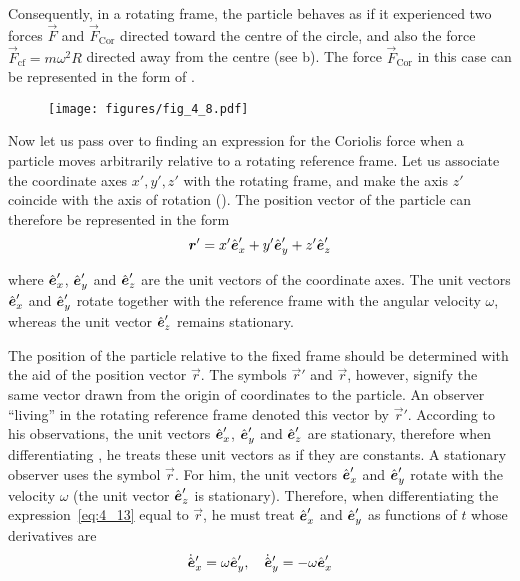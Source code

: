 \noindent
Consequently, in a rotating frame, the particle behaves as if it experienced two forces $\vec{F}$ and $\vec{F}_{\text{Cor}}$ directed toward the centre of the circle, and also the force $\vec{F}_{\text{cf}}=m\omega^2R$ directed away from the centre (see b). The force $\vec{F}_{\text{Cor}}$ in this case can be represented in the form of .

\begin{figure}[t]
	\begin{center}
		\texttt{[image: figures/fig\_4\_8.pdf]}
		\caption[]{}
		\label{fig:4_8}
	\end{center}
\end{figure}

Now let us pass over to finding an expression for the Coriolis force when a particle moves arbitrarily relative to a rotating reference frame. Let us associate the coordinate axes $x', y', z'$ with the rotating frame, and make the axis $z'$ coincide with the axis of rotation (). The position vector of the particle can therefore be represented in the form
\begin{equation}\label{eq:4_13}
\boldsymbol{r}' = x'\hat{\boldsymbol{e}}_{x}' + y'\hat{\boldsymbol{e}}_{y}' + z'\hat{\boldsymbol{e}}_{z}'
\end{equation}

\noindent
where $\hat{\boldsymbol{e}}_{x}'$, $\hat{\boldsymbol{e}}_{y}'$ and $\hat{\boldsymbol{e}}_{z}'$ are the unit vectors of the coordinate axes. The unit vectors $\hat{\boldsymbol{e}}_{x}'$ and $\hat{\boldsymbol{e}}_{y}'$ rotate together with the reference frame with the angular velocity $\omega$, whereas the unit vector $\hat{\boldsymbol{e}}_{z}'$ remains stationary.

The position of the particle relative to the fixed frame should be determined with the aid of the position vector $\vec{r}$. The symbols $\vec{r}'$ and $\vec{r}$, however, signify the same vector drawn from the origin of coordinates to the particle. An observer ``living'' in the rotating reference frame denoted this vector by $\vec{r}'$. According to his observations, the unit vectors $\hat{\boldsymbol{e}}_{x}'$, $\hat{\boldsymbol{e}}_{y}'$ and $\hat{\boldsymbol{e}}_{z}'$ are stationary, therefore when differentiating , he treats these unit vectors as if they are constants. A stationary observer uses the symbol $\vec{r}$. For him, the unit vectors $\hat{\boldsymbol{e}}_{x}'$ and $\hat{\boldsymbol{e}}_{y}'$ rotate with the velocity $\omega$ (the unit vector $\hat{\boldsymbol{e}}_{z}'$ is stationary). Therefore, when differentiating the expression~\eqref{eq:4_13} equal to $\vec{r}$, he must treat $\hat{\boldsymbol{e}}_{x}'$ and $\hat{\boldsymbol{e}}_{y}'$ as functions of $t$ whose derivatives are
\begin{equation}\label{eq:4_14}
\dot{\hat{\boldsymbol{e}}}_x' = \omega\hat{\boldsymbol{e}}_{y}',\quad \dot{\hat{\boldsymbol{e}}}_y' = -\omega\hat{\boldsymbol{e}}_{x}'
\end{equation}

